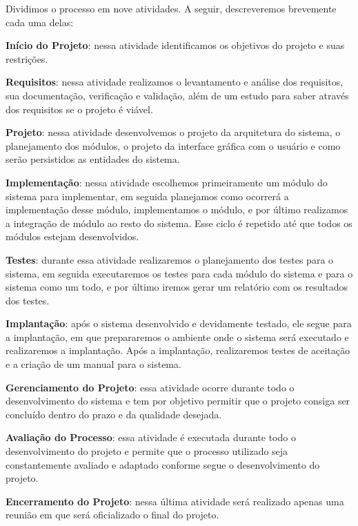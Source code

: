 Dividimos o processo em nove atividades. A seguir, descreveremos brevemente cada uma delas:
\begin{alineascomnumero}
	\item \textbf{In\'icio do Projeto}: nessa atividade identificamos os objetivos do projeto e suas restri\c{c}\~oes.
	\item \textbf{Requisitos}: nessa atividade realizamos o levantamento e an\'alise dos requisitos, sua documenta\c{c}\~ao, verifica\c{c}\~ao e valida\c{c}\~ao, al\'em de um estudo para saber 
atrav\'es dos requisitos se o projeto \'e vi\'avel. 
	\item \textbf{Projeto}: nessa atividade desenvolvemos o projeto da arquitetura do sistema, o planejamento dos m\'odulos, o projeto da interface gr\'afica com o usu\'ario  e como ser\~ao 
persistidos as entidades do sistema.
	\item \textbf{Implementação}: nessa atividade escolhemos primeiramente um m\'odulo do sistema para implementar, em seguida planejamos como ocorrer\'a a implementa\c{c}\~ao desse 
m\'odulo, implementamos o m\'odulo, e por \'ultimo realizamos a integra\c{c}\~ao de m\'odulo ao resto do sistema. Esse ciclo \'e repetido at\'e que todos os m\'odulos estejam desenvolvidos.
	\item \textbf{Testes}: durante essa atividade realizaremos o planejamento dos testes para o sistema, em seguida executaremos os testes 
para cada m\'odulo do sistema e para o sistema como um todo, e por \'ultimo iremos gerar um relat\'orio com os resultados dos testes.
	\item \textbf{Implantação}: ap\'os o sistema desenvolvido e devidamente testado, ele segue para a implanta\c{c}\~ao, em que prepararemos 
o ambiente onde o sistema ser\'a executado e realizaremos a implanta\c{c}\~ao. Ap\'os a implanta\c{c}\~ao, realizaremos testes de 
aceita\c{c}\~ao e a cria\c{c}\~ao de um manual para o sistema.
	\item \textbf{Gerenciamento do Projeto}: essa atividade ocorre durante todo o desenvolvimento do sistema e tem por objetivo permitir que o projeto consiga ser conclu\'ido dentro do prazo e da 
qualidade desejada.
	\item \textbf{Avalia\c{c}\~ao do Processo}: essa atividade \'e executada durante todo o desenvolvimento do projeto e permite que o processo utilizado seja constantemente avaliado e adaptado 
conforme segue o desenvolvimento do projeto.
	\item \textbf{Encerramento do Projeto}: nessa \'ultima atividade ser\'a realizado apenas uma reuni\~ao em que ser\'a oficializado o final do projeto.
\end{alineascomnumero}


